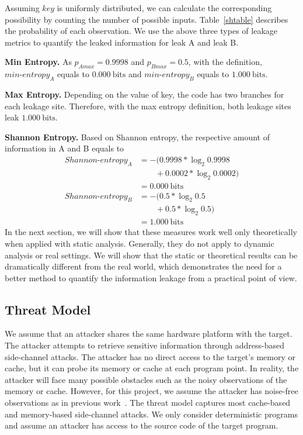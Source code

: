 {Assuming $\mathit{key}$ is uniformly distributed, we can calculate the corresponding
possibility by counting the number of possible inputs. Table~\ref{shtable}
describes the probability of each observation. We use the above three types of 
leakage metrics to quantify the leaked information for leak A and leak B.

\vspace{3pt}
\textbf{Min Entropy.}
As $p_{A\mathit{max}} = 0.9998$ and $p_{B\mathit{max}} = 0.5$, 
with the definition, $\mathit{min\text{-}entropy_A}$ equals to
$0.000\ \mathrm{bits}$ and $\mathit{min\text{-}entropy_B}$ equals to
$1.000\ \mathrm{bits}$.

\textbf{Max Entropy.}
Depending on the value of key, the code has two branches for each leakage site. 
Therefore, with the max entropy definition, both leakage sites leak $1.000\ \mathrm{bits}$.

\textbf{Shannon Entropy.}
Based on Shannon entropy, the respective amount of information in A and B equals to
{\footnotesize
\begin{align*}
    \mathit{Shannon\text{-}entropy_A} & = -(0.9998*\log_{2}0.9998      \\
                                    & \qquad+ 0.0002*\log_{2}0.0002)  \\
                                    & = 0.000\ \mathrm{bits}         \\
    \mathit{Shannon\text{-}entropy_B} & = -(0.5*\log_{2}0.5      \\
                                    & \qquad+ 0.5*\log_{2}0.5)        \\
                                    & = 1.000\ \mathrm{bits}                             
\end{align*}
}
In the next section, we will show that these measures work well only
theoretically when applied with static analysis. 
Generally, they do not apply to dynamic analysis or real
settings. We will show that the static or theoretical results can be
dramatically different from the real world, which demonstrates the need for a better method to
quantify the information leakage from a practical point of view. 
}

\subsection{Threat Model}
We assume that an attacker shares the same hardware platform with the target.
The attacker attempts to retrieve sensitive information through address-based
side-channel attacks. The attacker has no direct access to the target's memory or cache,
but it can probe its memory or cache at each program point. In reality, the
attacker will face many possible obstacles such as the noisy observations 
of the memory or cache. However, for this project, we assume
the attacker has noise-free observations as in previous work~\cite{203878,182946,Brotzman19Casym}. 
The threat model captures most cache-based and memory-based side-channel attacks. 
We only consider deterministic programs and assume an attacker 
has access to the source code  of the target program.
